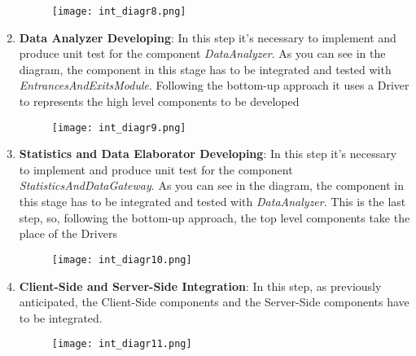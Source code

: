 \begin{enumerate}
\begin{figure}[H]
                \centering
                \texttt{[image: int\_diagr8.png]}
            \end{figure}
            \item \textbf{Data Analyzer Developing}: In this step it's necessary to implement and produce unit test for the component \textit{DataAnalyzer}. As you can see in the diagram, the component in this stage has to be integrated and tested with \textit{EntrancesAndExitsModule}. Following the bottom-up approach it uses a Driver to represents the high level components to be developed \begin{figure}[H]
                \centering
                \texttt{[image: int\_diagr9.png]}
            \end{figure}
            \item \textbf{Statistics and Data Elaborator Developing}: In this step it's necessary to implement and produce unit test for the component \textit{StatisticsAndDataGateway}. As you can see in the diagram, the component in this stage has to be integrated and tested with \textit{DataAnalyzer}. This is the last step, so, following the bottom-up approach, the top level components take the place of the Drivers \begin{figure}[H]
                \centering
                \texttt{[image: int\_diagr10.png]}
            \end{figure}
            \item \textbf{Client-Side and Server-Side Integration}: In this step, as previously anticipated, the Client-Side components and the Server-Side components have to be integrated. \begin{figure}[H]
                \centering
                \texttt{[image: int\_diagr11.png]}
            \end{figure}
        \end{enumerate}
